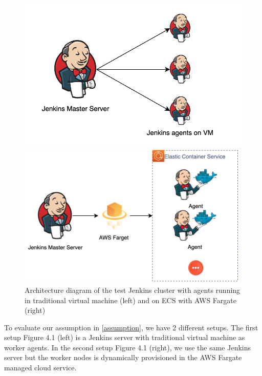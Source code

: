 \begin{figure}[h]
    \centering
    \begin{minipage}{0.45\textwidth}
        \centering
        \includegraphics[width=\textwidth]{pics/jenkins-on-vm.png} %
    \end{minipage}\hfill
    \begin{minipage}{0.54\textwidth}
        \centering
        \includegraphics[width=\textwidth]{pics/jenkins-on-fargate.png} %
    \end{minipage}
    \caption{Architecture diagram of the test Jenkins cluster with agents running in traditional virtual machine (left) and on ECS with AWS Fargate (right)}
\end{figure}
To evaluate our assumption in \ref{assumption}, we have 2 different setups. The first setup Figure 4.1 (left) is a Jenkins server with traditional virtual machine as worker agents. In the second setup Figure 4.1 (right), we use the same Jenkins server but the worker nodes is dynamically provisioned in the AWS Fargate managed cloud service.

